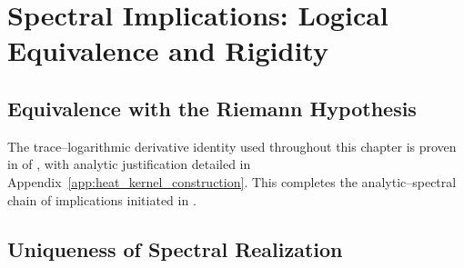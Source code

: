 \section{Spectral Implications: Logical Equivalence and Rigidity}
\label{sec:spectral_implications}




\subsection{Equivalence with the Riemann Hypothesis}
\label{sec:rh_equivalence}















\medskip
\noindent
The trace–logarithmic derivative identity used throughout this chapter is proven in  of , with analytic justification detailed in Appendix~\ref{app:heat_kernel_construction}. This completes the analytic–spectral chain of implications initiated in .

\subsection{Uniqueness of Spectral Realization}
\label{sec:uniqueness_spectral_realization}

